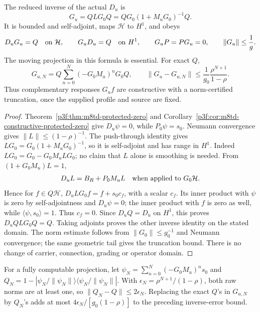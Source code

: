 \documentclass[11pt,a4paper]{article}
\begin{document}
\begin{theorem}
\label{p3f:thm:native-shift-complement-inverse}
The reduced inverse of the actual \(D_u\) is
\begin{equation}
 G_u=QLG_0Q=QG_0(1+M_uG_0)^{-1}Q.
 \label{p3f:eq:native-shift-complement-inverse}
\end{equation}
It is bounded and self-adjoint, maps \(\mathcal H\) to \(H^1\), and obeys
\[
 D_uG_u=Q\quad\hbox{on }\mathcal H,\qquad
 G_uD_u=Q\quad\hbox{on }H^1,\qquad G_uP=PG_u=0,
 \qquad \lVert G_u\rVert\le\frac1g.
\]
The moving projection in this formula is essential. For exact \(Q\),
\[
 G_{u,N}=Q\sum_{n=0}^N(-G_0M_u)^nG_0Q,\qquad
 \lVert G_u-G_{u,N}\rVert
 \le\frac1{g_0}\frac{\rho^{N+1}}{1-\rho}.
\]
Thus complementary responses \(G_uf\) are constructive with a
norm-certified truncation, once the supplied profile and source are fixed.
\end{theorem}
\begin{proof}
Theorem~\ref{p3f:thm:m8td-protected-zero} and
Corollary~\ref{p3f:cor:m8td-constructive-protected-zero} give \(D_u\psi=0\), while
\(P_0\psi=s_0\). Neumann convergence gives \(\lVert L\rVert\le(1-\rho)^{-1}\).
The push-through identity gives \(LG_0=G_0(1+M_uG_0)^{-1}\), so it is
self-adjoint and has range in \(H^1\). Indeed
\(LG_0=G_0-G_0M_uLG_0\); no claim that \(L\) alone is smoothing is needed.
From \((1+G_0M_u)L=1\),
\[
 D_uL=B_R+P_0M_uL\quad\hbox{when applied to }G_0\mathcal H.
\]
Hence for \(f\in Q\mathcal H\),
\(D_uLG_0f=f+s_0 c_f\), with a scalar \(c_f\). Its inner product with
\(\psi\) is zero by self-adjointness and \(D_u\psi=0\); the inner product
with \(f\) is zero as well, while \(\langle\psi,s_0\rangle=1\).
Thus \(c_f=0\). Since \(D_uQ=D_u\) on \(H^1\), this proves
\(D_uQLG_0Q=Q\). Taking adjoints proves the other inverse identity on
the stated domain. The norm estimate follows from
\(\lVert G_0\rVert\le g_0^{-1}\) and Neumann convergence; the same
geometric tail gives the truncation bound. There is no change of carrier,
connection, grading or operator domain.
\end{proof}

For a fully computable projection, let
\(\psi_N=\sum_{n=0}^N(-G_0M_u)^ns_0\) and
\(Q_N=1-|\psi_N/\lVert\psi_N\rVert\rangle
\langle\psi_N/\lVert\psi_N\rVert|\). With
\(\epsilon_N=\rho^{N+1}/(1-\rho)\), both raw norms are at least one,
so \(\lVert Q_N-Q\rVert\le2\epsilon_N\). Replacing the exact \(Q\)'s
in \(G_{u,N}\) by \(Q_N\)'s adds at most
\(4\epsilon_N/[g_0(1-\rho)]\) to the preceding inverse-error bound.
\end{document}
